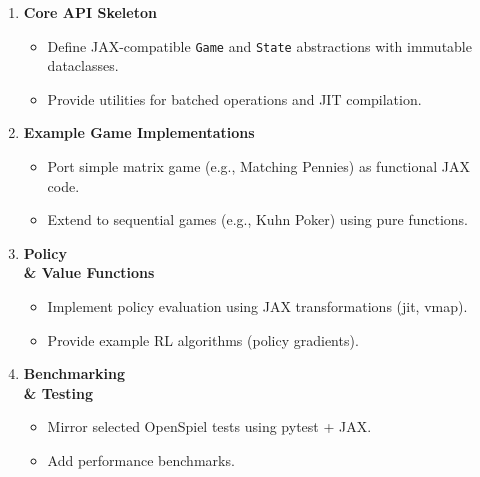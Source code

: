 \begin{enumerate}[leftmargin=*]
  \item \textbf{Core API Skeleton}
    \begin{itemize}[leftmargin=*]
      \item Define JAX-compatible \texttt{Game} and \texttt{State} abstractions with immutable dataclasses.
      \item Provide utilities for batched operations and JIT compilation.
    \end{itemize}
  \item \textbf{Example Game Implementations}
    \begin{itemize}[leftmargin=*]
      \item Port simple matrix game (e.g., Matching Pennies) as functional JAX code.
      \item Extend to sequential games (e.g., Kuhn Poker) using pure functions.
    \end{itemize}
  \item \textbf{Policy \\& Value Functions}
    \begin{itemize}[leftmargin=*]
      \item Implement policy evaluation using JAX transformations (jit, vmap).
      \item Provide example RL algorithms (policy gradients).
    \end{itemize}
  \item \textbf{Benchmarking \\& Testing}
    \begin{itemize}[leftmargin=*]
      \item Mirror selected OpenSpiel tests using pytest + JAX.
      \item Add performance benchmarks.
    \end{itemize}
\end{enumerate}
